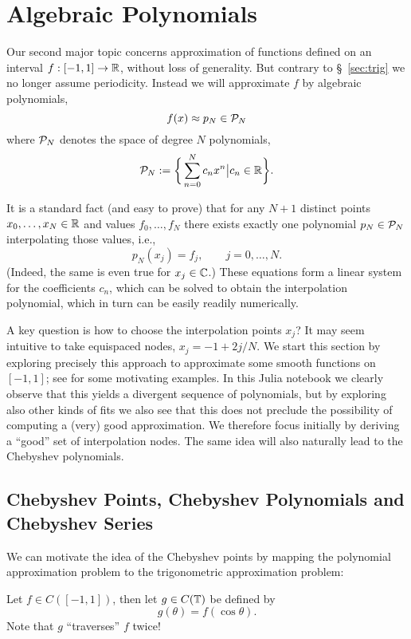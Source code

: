 

\section{Algebraic Polynomials}
%
\label{sec:poly}
%
Our second major topic concerns approximation of functions defined on an
interval $f : [-1, 1] \to \mathbb{R}$, without loss of generality. But contrary to
\S~\ref{sec:trig} we no longer assume periodicity. Instead we will approximate
$f$ by algebraic polynomials,
\[
      f(x) \approx p_N \in \mathcal{P}_N
\]
where $\mathcal{P}_N$ denotes the space of degree $N$ polynomials,
\[
   \mathcal{P}_N := \bigg\{ \sum_{n = 0}^N c_n x^n \big| c_n \in \mathbb{R} \bigg\}.
\]

It is a standard fact (and easy to prove) that for any $N+1$ distinct 
points $x_0, \dots, x_N \in \mathbb{R}$ and values $f_0, \dots, f_N$ there exists exactly one polynomial 
$p_N \in \mathcal{P}_N$ interpolating those values, i.e., 
\[
   p_N(x_j) = f_j, \qquad j = 0, \dots, N.
\]
(Indeed, the same is even true for $x_j \in \mathbb{C}$.) These equations form 
a linear system for the coefficients $c_n$, which can be solved to obtain 
the interpolation polynomial, which in turn can be easily readily 
numerically. 

A key question is how to choose the interpolation points $x_j$? It may seem
intuitive to take equispaced nodes, $x_j = -1 + 2j/N$.  We start this section by
exploring precisely this approach to approximate some smooth functions on
$[-1,1]$; see \nbpoly for some motivating examples. In this Julia notebook we
clearly observe that this yields a divergent sequence of polynomials, but by
exploring also other kinds of fits we also see that this does not preclude the
possibility of computing a (very) good approximation. We therefore focus
initially by deriving a ``good'' set of interpolation nodes. The same idea will
also naturally lead to the Chebyshev polynomials.

\subsection{Chebyshev Points, Chebyshev Polynomials and Chebyshev Series}
%
We can motivate the idea of the Chebyshev points by mapping the polynomial
approximation problem to the trigonometric approximation problem:

Let $f\in C([-1,1])$, then let $g \in C(\mathbb{T})$ be defined by
\[
   g(\theta) = f(\cos\theta).
\]
Note that $g$ ``traverses'' $f$ twice!

